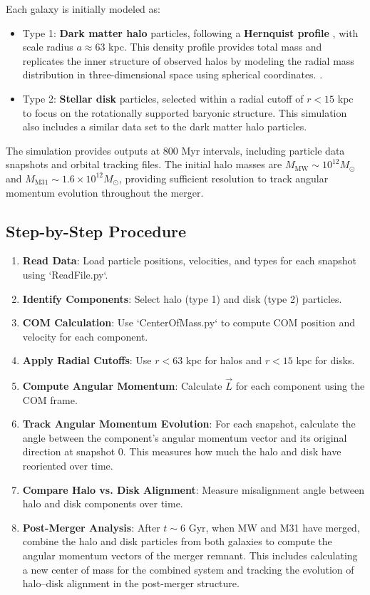 \documentclass[twocolumn]{aastex631}
\begin{document}
Each galaxy is initially modeled as:
\begin{itemize}
    \item Type 1: \textbf{Dark matter halo} particles, following a \textbf{Hernquist profile} \citep{Hernquist1990}, with scale radius $a \approx 63$ kpc. This density profile provides total mass and replicates the inner structure of observed halos by modeling the radial mass distribution in three-dimensional space using spherical coordinates.
.
    \item Type 2: \textbf{Stellar disk} particles, selected within a radial cutoff of $r < 15$ kpc to focus on the rotationally supported baryonic structure. This simulation also includes a similar data set to the dark matter halo particles.
\end{itemize}

The simulation provides outputs at 800 Myr intervals, including particle data snapshots and orbital tracking files. The initial halo masses are $M_{\text{MW}} \sim 10^{12} M_\odot$ and $M_{\text{M31}} \sim 1.6 \times 10^{12} M_\odot$, providing sufficient resolution to track angular momentum evolution throughout the merger.


\subsection{Step-by-Step Procedure}

\begin{enumerate}
    \item \textbf{Read Data}: Load particle positions, velocities, and types for each snapshot using `ReadFile.py`.
    \item \textbf{Identify Components}: Select halo (type 1) and disk (type 2) particles.
    \item \textbf{COM Calculation}: Use `CenterOfMass.py` to compute COM position and velocity for each component.
    \item \textbf{Apply Radial Cutoffs}: Use $r < 63$ kpc for halos and $r < 15$ kpc for disks.
    \item \textbf{Compute Angular Momentum}: Calculate $\vec{L}$ for each component using the COM frame.
    \item \textbf{Track Angular Momentum Evolution}: For each snapshot, calculate the angle between the component's angular momentum vector and its original direction at snapshot 0. This measures how much the halo and disk have reoriented over time.

    \item \textbf{Compare Halo vs. Disk Alignment}: Measure misalignment angle between halo and disk components over time.
    
   \item \textbf{Post-Merger Analysis}: After $t \sim 6$ Gyr, when MW and M31 have merged, combine the halo and disk particles from both galaxies to compute the angular momentum vectors of the merger remnant. This includes calculating a new center of mass for the combined system and tracking the evolution of halo–disk alignment in the post-merger structure.

\end{enumerate}
\end{document}
